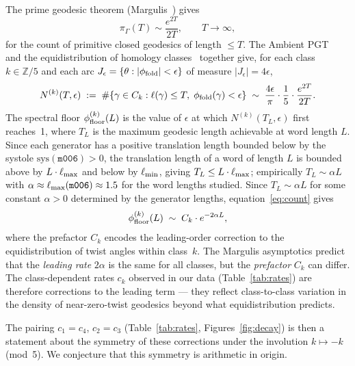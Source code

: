 \documentclass[12pt,a4paper]{article}
\newcommand{\mfld}[1]{\texttt{#1}}
\begin{document}
The prime geodesic theorem (Margulis~\cite{Margulis69}) gives
\begin{equation}
  \pi_\Gamma(T) \sim \frac{e^{2T}}{2T}, \qquad T\to\infty,
  \label{eq:pgt}
\end{equation}
for the count of primitive closed geodesics of length $\leq T$.
The Ambient PGT~\cite{BalogBiggs23} and the equidistribution of homology
classes~\cite{Sunada85} together give, for each class $k\in\mathbb{Z}/5$
and each arc $J_\epsilon = \{\theta : |\phi_{\rm fold}|<\epsilon\}$
of measure $|J_\epsilon|=4\epsilon$,
\begin{equation}
  N^{(k)}(T,\epsilon)
  \;:=\;\#\{\gamma\in C_k : \ell(\gamma)\leq T,\;\phi_{\rm fold}(\gamma)<\epsilon\}
  \;\sim\; \frac{4\epsilon}{\pi}\cdot\frac{1}{5}\cdot\frac{e^{2T}}{2T}.
  \label{eq:count}
\end{equation}
The spectral floor $\phi_{\rm floor}^{(k)}(L)$ is the value of $\epsilon$
at which $N^{(k)}(T_L,\epsilon)$ first reaches~1,
where $T_L$ is the maximum geodesic length achievable at word length $L$.
Since each generator has a positive translation length bounded below by
the systole $\mathrm{sys}(\mfld{m006})>0$,
the translation length of a word of length $L$ is bounded above by
$L\cdot\ell_{\rm max}$ and below by $\ell_{\rm min}$, giving
$T_L\leq L\cdot\ell_{\rm max}$; empirically $T_L\sim\alpha L$ with
$\alpha\approx\ell_{\rm max}(\mfld{m006})\approx 1.5$ for the word lengths studied.
Since $T_L \sim \alpha L$ for some constant $\alpha>0$ determined by the
generator lengths, equation~\eqref{eq:count} gives
\begin{equation}
  \phi_{\rm floor}^{(k)}(L)
  \;\sim\; C_k \cdot e^{-2\alpha L},
  \label{eq:floor_asymptotic}
\end{equation}
where the prefactor $C_k$ encodes the leading-order correction to the
equidistribution of twist angles within class~$k$.
The Margulis asymptotics predict that the \emph{leading rate} $2\alpha$
is the same for all classes, but the \emph{prefactor} $C_k$ can differ.
The class-dependent rates $c_k$ observed in our data (Table~\ref{tab:rates})
are therefore corrections to the leading term --- they reflect
class-to-class variation in the density of near-zero-twist geodesics
beyond what equidistribution predicts.

The pairing $c_1=c_4$, $c_2=c_3$ (Table~\ref{tab:rates},
Figures~\ref{fig:decay}) is then a statement about the symmetry of
these corrections under the involution $k\mapsto -k$ (mod~5).
We conjecture that this symmetry is arithmetic in origin.
\end{document}
